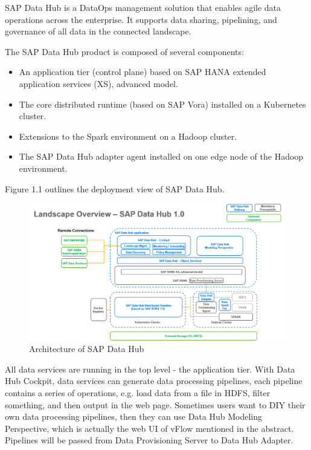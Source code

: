 \documentclass[article,colorback,accentcolor=tud4c]{tudreport}
\begin{document}
SAP Data Hub is a DataOps management solution that enables agile data operations across the enterprise. It supports data sharing, pipelining, and governance of all data in the connected landscape.

The SAP Data Hub product is composed of several components:
\begin{itemize}\itemsep-\the\parsep
\item An application tier (control plane) based on SAP HANA extended application services (XS), advanced model.
\item The core distributed runtime (based on SAP Vora) installed on a Kubernetes cluster.
\item Extensions to the Spark environment on a Hadoop cluster.
\item The SAP Data Hub adapter agent installed on one edge node of the Hadoop environment.
\end{itemize}

Figure 1.1 outlines the deployment view of SAP Data Hub.

\begin{figure}[!h]
   	\centering
   	\includegraphics[width=\textwidth]{architecture}
   	\caption{Architecture of SAP Data Hub}
\end{figure}

All data services are running in the top level - the application tier. With Data Hub Cockpit, data services can generate data processing pipelines, each pipeline contains a series of operations, e.g. load data from a file in HDFS, filter something, and then output in the web page. Sometimes users want to DIY their own data processing pipelines, then they can use Data Hub Modeling Perspective, which is actually the web UI of vFlow mentioned in the abstract. Pipelines will be passed from Data Provisioning Server to Data Hub Adapter. 
\end{document}
